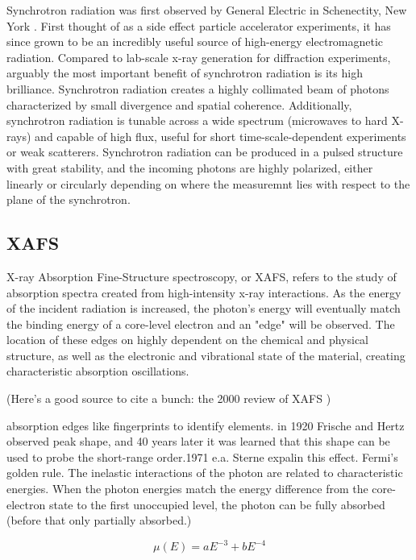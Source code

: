 Synchrotron radiation was first observed by General Electric in Schenectity, New York \cite{firstSynchrotronRadPaper}. First thought of as a side effect particle accelerator experiments, it has since grown to be an incredibly useful source of high-energy electromagnetic radiation. Compared to lab-scale x-ray generation for diffraction experiments, arguably the most important benefit of synchrotron radiation is its high brilliance. Synchrotron radiation creates a highly collimated beam of photons characterized by small divergence and spatial coherence. Additionally, synchrotron radiation is tunable across a wide spectrum (microwaves to hard X-rays) and capable of high flux, useful for short time-scale-dependent experiments or weak scatterers. Synchrotron radiation can be produced in a pulsed structure with great stability, and the incoming photons are highly polarized, either linearly or circularly depending on where the measuremnt lies with respect to the plane of the synchrotron.

\subsection{XAFS}
X-ray Absorption Fine-Structure spectroscopy, or XAFS, refers to the study of absorption spectra created from high-intensity x-ray interactions. As the energy of the incident radiation is increased, the photon's energy will eventually match the binding energy of a core-level electron and an "edge" will be observed. The location of these edges on highly dependent on the chemical and physical structure, as well as the electronic and vibrational state of the material, creating characteristic absorption oscillations.

(Here's a good source to cite a bunch: the 2000 review of XAFS
\cite{rehrXAFS2000review})
\cite{newville2014fundamentals}

absorption edges like fingerprints to identify elements. in 1920 Frische and Hertz observed peak shape, and 40 years later it was learned that this shape can be used to probe the short-range order.1971 e.a. Sterne expalin this effect. Fermi's golden rule. The inelastic interactions of the photon are related to characteristic energies. When the photon energies match the energy difference from the core-electron state to the first unoccupied level, the photon can be fully absorbed (before that only partially absorbed.)


\begin{equation}
    \label{Victoreen}
    \mu(E) = aE^{-3} + bE^{-4}
\end{equation}

